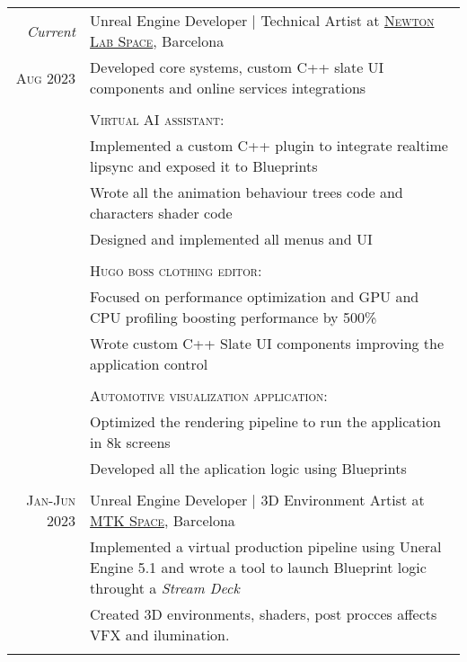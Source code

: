 \documentclass[a4paper,10pt]{article} %
\begin{document}
\begin{tabular}{r|p{11cm}}
\emph{Current} &  Unreal Engine Developer | Technical Artist at \href{https://www.newtonlabspace.com}{\textsc{Newton Lab Space}}, Barcelona \\
\textsc{Aug 2023} & \footnotesize{Developed core systems, custom C++ slate UI components and online services integrations}\\
& \\
& \textsc{Virtual AI assistant}: \\
& \footnotesize{Implemented a custom C++ plugin to integrate realtime lipsync and exposed it to Blueprints}\\
& \footnotesize{Wrote all the animation behaviour trees code and characters shader code}\\
& \footnotesize{Designed and implemented all menus and UI}\\
& \\
& \textsc{Hugo boss clothing editor}: \\
& \footnotesize{Focused on performance optimization and GPU and CPU profiling boosting performance by 500\%}\\
& \footnotesize{Wrote custom C++ Slate UI components improving the application control}\\
& \\
& \textsc{Automotive visualization application}: \\
& \footnotesize{Optimized the rendering pipeline to run the application in 8k screens}\\
& \footnotesize{Developed all the aplication logic using Blueprints}\\
\multicolumn{2}{c}{} \\


\textsc{Jan-Jun 2023} & Unreal Engine Developer | 3D Environment Artist at \href{https://mtkspace.com/home/}{\textsc{MTK Space}}, Barcelona \emph{}\\
& \footnotesize{Implemented a virtual production pipeline using Uneral Engine 5.1 and wrote a tool to launch Blueprint logic throught a \textit{Stream Deck}}\\
& \footnotesize{Created 3D environments, shaders, post procces affects VFX and ilumination.}\\
\multicolumn{2}{c}{} \\
\end{tabular}

\end{document}
